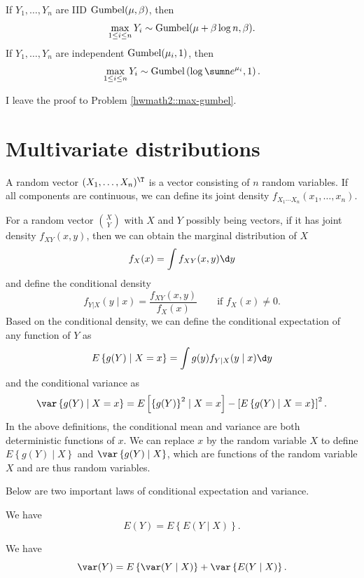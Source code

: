 \begin{proposition}
\label{prop::max-gumbel}
If $Y_1, \ldots, Y_n$ are IID $\textup{Gumbel}(\mu,\beta)$, then
$$
\max_{1\leq i \leq n}  Y_i \sim \textup{Gumbel}(\mu + \beta \log n, \beta ).
$$
If $Y_1, \ldots, Y_n$ are independent $\textup{Gumbel}(\mu_i, 1)$, then
$$
\max_{1\leq i \leq n}  Y_i \sim \textup{Gumbel}\left(\log \sumn e^{\mu_i}, 1 \right). 
$$
\end{proposition}


I leave the proof to Problem \ref{hwmath2::max-gumbel}. 




\section{Multivariate distributions}

A random vector $(X_{1},\ldots,X_{n})^{\T}$ is a vector consisting of $n$ random
variables. If all components are continuous, we can define its joint
density $f_{X_{1}\cdots X_{n}}(x_{1},\ldots,x_{n}).$ 

For a random vector $\binom{X}{Y}$ with $X$ and $Y$ possibly being
vectors, if it has joint density $f_{XY}(x,y)$, then we can obtain
the marginal distribution of $X$   
$$
f_{X}(x)=\int f_{XY}(x,y)\d y
$$
and define the conditional density  
\[
f_{Y|X}(y\mid x)=\frac{f_{XY}(x,y)}{f_{X}(x)}\qquad \text{if }  f_{X}(x)\neq 0. 
\]
Based on the conditional density, we can define the conditional expectation
of any function of $Y$  as 
\[
E\left\{ g(Y)\mid X=x\right\} =\int g(y)f_{Y|X}(y\mid x)\d y
\]
and the conditional variance as 
\[
\var\left\{ g(Y)\mid X=x\right\} =E\left[\left\{ g(Y)\right\} ^{2}\mid X=x\right]-\left[E\left\{ g(Y)\mid X=x\right\} \right]^{2}.
\]
 In the above definitions, the conditional mean and variance are both deterministic
functions of $x$. We can replace $x$ by the random variable $X$ to define 
$E\left\{ g(Y)\mid X\right\} $
and $\var\left\{ g(Y)\mid X\right\} $, which are functions of the
random variable $X$ and are thus random variables. 

Below are two important laws of conditional expectation and variance. 

\begin{theorem}
 We have 
\[
E( Y ) =E\left\{  E ( Y \mid X ) \right\}  . 
\]
\end{theorem}


\begin{theorem}
\label{theorem::law-total-var}
We have 
\[
\var (Y) =E\left\{  \var( Y \mid X) \right\}  +\var\left\{  E(Y \mid X) \right\}  . 
\]
\end{theorem}
 

